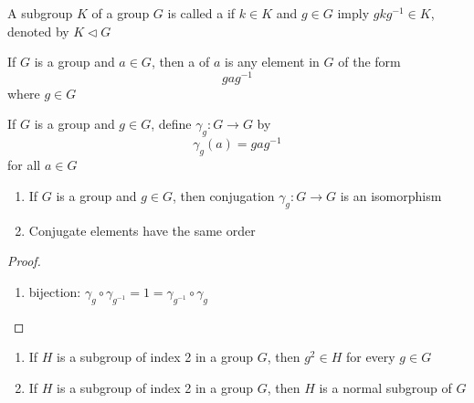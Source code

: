 \documentclass[11pt]{article}
\begin{document}
\begin{definition}[]
A subgroup \(K\) of a group \(G\) is called a  if \(k\in K\)
and \(g\in G\) imply \(gkg^{-1}\in K\), denoted by \(K\triangleleft G\)
\end{definition}

\begin{definition}[]
If \(G\) is a group and \(a\in G\), then a  of \(a\) is any element
in \(G\) of the form
\begin{equation*}
gag^{-1}
\end{equation*}
where \(g\in G\)
\end{definition}

\begin{definition}[]
If \(G\) is a group and \(g\in G\), define  \(\gamma_g:G\to G\) by
\begin{equation*}
\gamma_g(a)=gag^{-1}
\end{equation*}
for all \(a\in G\)
\end{definition}

\begin{proposition}[]
\begin{enumerate}
\item If \(G\) is a group and \(g\in G\), then conjugation \(\gamma_g:G\to G\) is an
isomorphism
\item Conjugate elements have the same order
\end{enumerate}
\end{proposition}

\begin{proof}
\begin{enumerate}
\item bijection: \(\gamma_g\circ\gamma_{g^{-1}}=1=\gamma_{g^{-1}}\circ\gamma_g\)
\end{enumerate}
\end{proof}

\begin{proposition}[]
\begin{enumerate}
\item If \(H\) is a subgroup of index 2 in a group \(G\), then \(g^2\in H\) for every
\(g\in G\)
\item If \(H\) is a subgroup of index 2 in a group \(G\), then \(H\) is a normal
subgroup of \(G\)
\end{enumerate}
\end{proposition}
\end{document}

